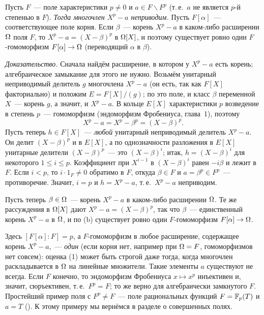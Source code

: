 \begin{example}[2.3]
Пусть $F$~--- поле характеристики $p\ne0$ и $a\in F\smallsetminus F^p$ (т.\,е.\ $a$ не является $p$-й степенью в $F$).
\emph{Тогда многочлен $X^p-a$ неприводим.} Пусть $F[\alpha]$~--- соответствующее поле корня. Если $\beta$~--- корень
$X^p-a$ в каком-либо расширении $\Omega$ поля $F$, то $X^p-a=(X-\beta)^p$ в $\Omega[X]$, и поэтому существует ровно один
$F$-гомоморфизм $F[\alpha]\to\Omega$ (переводящий $\alpha$ в $\beta$).

\emph{Доказательство.} Сначала найдём расширение, в котором у $X^p-a$ есть корень; алгебраическое замыкание для этого
не нужно. Возьмём унитарный неприводимый делитель $g$ многочлена $X^p-a$ (он есть, так как $F[X]$ факториально) и
положим $E=F[X]/(g)$; по  это поле, и класс $\beta$ переменной $X$~--- корень $g$, а значит, и $X^p-a$. В
кольце $E[X]$ характеристики $p$ возведение в степень $p$~--- гомоморфизм (эндоморфизм Фробениуса, глава~1), поэтому
\[
X^p-a=X^p-\beta^p=(X-\beta)^p .
\]
Пусть теперь $h\in F[X]$~--- \emph{любой} унитарный неприводимый делитель $X^p-a$. Он делит $(X-\beta)^p$ и в $E[X]$, а
по однозначности разложения в $E[X]$ унитарные делители $(X-\beta)^p$~--- это $(X-\beta)^i$; итак, $h=(X-\beta)^i$ для
некоторого $1\le i\le p$. Коэффициент при $X^{i-1}$ в $(X-\beta)^i$ равен $-i\beta$ и лежит в $F$. Если $i<p$, то
$i\cdot1_F\ne0$ обратимо в $F$, откуда $\beta\in F$ и $a=\beta^p\in F^p$~--- противоречие. Значит, $i=p$ и $h=X^p-a$, т.\,е.\
$X^p-a$ неприводим.

Пусть теперь $\beta\in\Omega$~--- корень $X^p-a$ в каком-либо расширении $\Omega$. Те же рассуждения в $\Omega[X]$ дают
$X^p-a=(X-\beta)^p$, так что $\beta$~--- единственный корень $X^p-a$ в $\Omega$, и по \rf{2.1}(b) существует ровно один
$F$-гомоморфизм $F[\alpha]\to\Omega$.
\end{example}

Здесь $[F[\alpha]:F]=p$, а $F$-гомоморфизм в любое расширение, содержащее корень $X^p-a$,~--- \emph{один} (если корня
нет, например при $\Omega=F$, гомоморфизмов нет совсем): оценка \rf{2.1a}(1) может быть строгой даже
тогда, когда многочлен раскладывается в $\Omega$ на линейные множители. Такие элементы $a$ существуют не всегда. Если $F$
конечно, то эндоморфизм Фробениуса $x\mapsto x^p$ инъективен и, значит, сюръективен, т.\,е.\ $F^p=F$; то же верно для
алгебраически замкнутого $F$. Простейший пример поля с $F^p\ne F$~--- поле рациональных функций $F=\mathbb F_p(T)$ и $a=T$
(\rf{1.4a}). К этому примеру мы вернёмся в разделе о совершенных полях.

